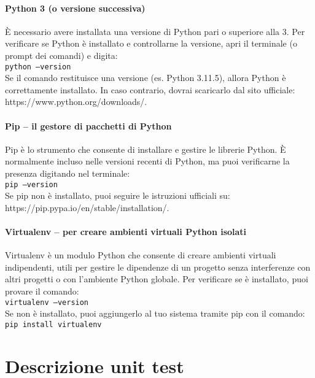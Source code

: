\documentclass[11pt,a4paper]{report}
\begin{document}
\paragraph{Python 3 (o versione successiva)}
È necessario avere installata una versione di Python pari o superiore alla 3.
Per verificare se Python è installato e controllarne la versione, apri il terminale (o prompt dei comandi) e digita:\\
\texttt{python --version}\\
Se il comando restituisce una versione (es. Python 3.11.5), allora Python è correttamente installato. In caso contrario, 
dovrai scaricarlo dal sito ufficiale: https://www.python.org/downloads/.\\
\paragraph{Pip – il gestore di pacchetti di Python}
Pip è lo strumento che consente di installare e gestire le librerie Python.
È normalmente incluso nelle versioni recenti di Python, ma puoi verificarne la presenza digitando nel terminale:\\
\texttt{pip --version}\\
Se pip non è installato, puoi seguire le istruzioni ufficiali su: https://pip.pypa.io/en/stable/installation/.\\
\paragraph{Virtualenv – per creare ambienti virtuali Python isolati}
Virtualenv è un modulo Python che consente di creare ambienti virtuali indipendenti, utili per gestire le dipendenze di un progetto 
senza interferenze con altri progetti o con l'ambiente Python globale.
Per verificare se è installato, puoi provare il comando:\\
\texttt{virtualenv --version}\\
Se non è installato, puoi aggiungerlo al tuo sistema tramite pip con il comando:\\
\texttt{pip install virtualenv}
\newpage
\section{Descrizione unit test}

\cleardoublepage
{}


\end{document}
